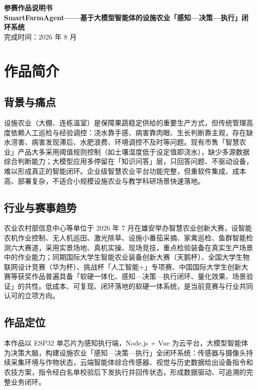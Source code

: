 ﻿\documentclass[11pt]{ctexart}
\begin{document}
\begin{center}
  {\LARGE\bfseries 参赛作品说明书}\\[8pt]
  {\large\bfseries SmartFarmAgent——基于大模型智能体的设施农业「感知—决策—执行」闭环系统}\\[4pt]
  {\normalsize 完成时间：2026 年 8 月}
\end{center}

\vspace{1.2em}

\section{作品简介}
\subsection{背景与痛点}
设施农业（大棚、连栋温室）是保障果蔬稳定供给的重要生产方式，但传统管理高度依赖人工巡检与经验调控：浇水靠手感、病害靠肉眼、生长判断靠主观，存在缺水涝害、病害发现滞后、水肥浪费、环境调控不及时等问题。现有市售「智慧农业」产品大多采用阈值规则控制（如土壤湿度低于设定值即浇水），缺少多源数据综合判断能力；大模型应用多停留在「知识问答」层，只回答问题、不驱动设备，难以形成真正的智能闭环。企业级智慧农业平台功能完整，但重软件集成、成本高、部署复杂，不适合小规模设施农业与教学科研场景快速落地。

\subsection{行业与赛事趋势}
农业农村部信息中心等单位于 2026 年 7 月在雄安举办智慧农业创新大赛，设智能农机作业控制、无人机巡田、激光除草、设施小番茄采摘、家禽巡检、鱼群智能检测六大赛道，采用实景场地、真机实操、现场竞技，重点检验装备在真实生产场景中的作业能力；同期国际大学生智能农业装备创新大赛（天鹅杯）、全国大学生物联网设计竞赛（华为杯）、挑战杯「人工智能+」专项赛、中国国际大学生创新大赛等获奖作品普遍具备「软硬一体化、感知—决策—执行闭环、量化效果、场景验证」的共性。低成本、可复现、闭环落地的软硬一体系统，是当前竞赛与行业共同认可的立项方向。

\subsection{作品定位}
本作品以 ESP32 单芯片为感知执行端，Node.js + Vue 为云平台，大模型智能体为决策大脑，构建设施农业「感知—决策—执行」全闭环系统：传感器与摄像头持续采集环境与作物状态，云端智能体综合传感器、视觉与历史数据给出设备指令和农技方案，指令经白名单校验后下发执行并回传状态，形成数据驱动、可追溯的完整业务闭环。
\end{document}
